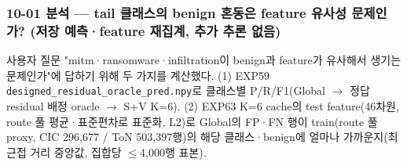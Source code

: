 \subsubsection{10-01 분석 — tail 클래스의 benign 혼동은 feature 유사성 문제인가? (저장 예측·feature 재집계, 추가 추론 없음)}
사용자 질문 "mitm·ransomware·infiltration이 benign과 feature가 유사해서 생기는 문제인가"에 답하기 위해 두 가지를 계산했다. (1) EXP59 \texttt{designed\allowbreak{}\_\allowbreak{}\allowbreak{}residua\allowbreak{}l\_\allowbreak{}\allowbreak{}oracle\allowbreak{}\_\allowbreak{}\allowbreak{}pred.\allowbreak{}np\allowbreak{}y}로 클래스별 P/\allowbreak{}R/\allowbreak{}F1(Global  \ensuremath{\rightarrow}  정답 residual 배정 oracle  \ensuremath{\rightarrow}  S+\allowbreak{}V K=\allowbreak{}6). (2) EXP63 K=\allowbreak{}6 cache의 test feature(46차원, route 풀 평균·표준편차로 표준화, L2)로 Global의 FP·FN 행이 train(route 풀 proxy, CIC 296,677 /\allowbreak{} ToN 503,397행)의 해당 클래스·benign에 얼마나 가까운지(최근접 거리 중앙값, 집합당 \ensuremath{\leq}4,000행 표본).

